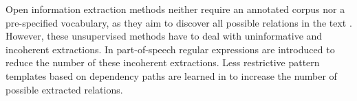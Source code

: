Open information extraction methods neither require an annotated corpus nor a pre-specified vocabulary, as they aim to discover all possible relations in the text \citep{Bankoetal2007}.
However, these unsupervised methods have to deal with uninformative and incoherent extractions. In \cite{Fader2011} part-of-speech regular expressions are introduced to reduce the number of these incoherent extractions. Less restrictive pattern templates based on dependency paths are learned in \cite{Mausam2012} to increase the number of possible extracted relations.
